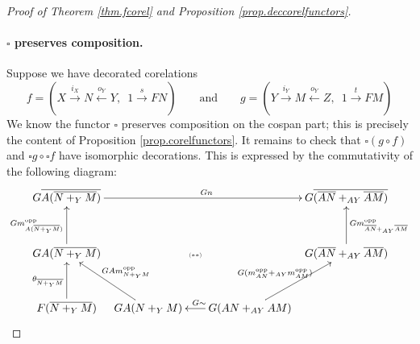 \begin{proof}[Proof of Theorem \ref{thm.fcorel} and Proposition
  \ref{prop.deccorelfunctors}]
  \paragraph{$\square$ preserves composition.} Suppose we have decorated corelations
  \[
    f=(X \stackrel{i_X}{\longrightarrow} N \stackrel{o_Y}{\longleftarrow} Y,
    \enspace 1 \stackrel{s}{\to} FN)
    \qquad
    \mbox{and}
    \qquad 
    g=(Y \stackrel{i_Y}{\longrightarrow} M \stackrel{o_Y}{\longleftarrow} Z,
    \enspace 1 \stackrel{t}{\to} FM)
  \]
  We know the functor $\square$ preserves composition on the cospan part; this
  is precisely the content of Proposition \ref{prop.corelfunctors}. It remains to
  check that $\square( g \circ f)$ and $\square g \circ \square f$ have
  isomorphic decorations. This is expressed by the commutativity of the
  following diagram:
  \[
    \xymatrixrowsep{1.1pc}
    \xymatrixcolsep{0pc}
    \xymatrix{
      G\overline{A(\overline{N+_YM})} \ar[rrrrrr]^{Gn} &&&&&&
      G\overline{(\overline{AN}+_{AY}\overline{AM})}\\
      \\
      GA(\overline{N+_YM}) \ar[uu]^{Gm^\opp_{A(\overline{N+_YM})}} &&&
      \textsc{\tiny($\ast\ast$)} &&& 
      G(\overline{AN}+_{AY}\overline{AM}) \ar[uu]_{Gm^\opp_{\overline{AN}+_{AY}\overline{AM}}} \\
      \\
      F(\overline{N+_YM}) \ar[uu]^{\theta_{\overline{N+_YM}}} & %
      &
      GA(N+_YM) \ar[uull]_{GAm^\opp_{N+_YM}} && 
      G(AN+_{AY}AM) \ar[ll]_{G\sim} \ar[uurr]^{G(m_{AN}^\opp +_{AY}m_{AM}^\opp)}
}\]
\end{proof}

